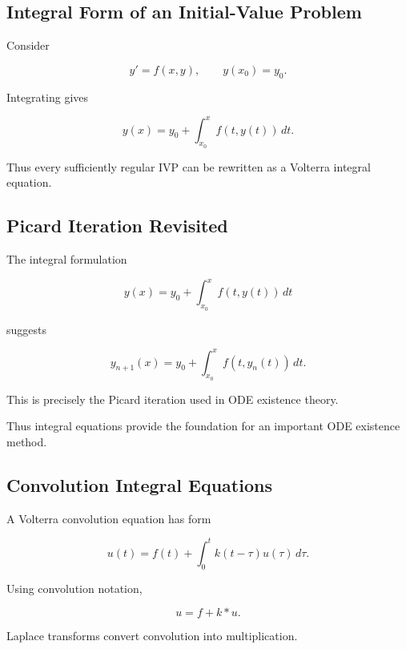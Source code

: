 \subsection{Integral Form of an Initial-Value Problem}
\label{subsec:ivp-integral-form}

Consider

\[
y'=f(x,y),
\qquad
y(x_0)=y_0.
\]

Integrating gives

\[
\boxed{
y(x)
=
y_0
+
\int_{x_0}^{x}
f(t,y(t))\,dt.
}
\]

Thus every sufficiently regular IVP can be rewritten as a Volterra
integral equation.

\subsection{Picard Iteration Revisited}
\label{subsec:picard-integral-equation}

The integral formulation

\[
y(x)
=
y_0
+
\int_{x_0}^{x}
f(t,y(t))\,dt
\]

suggests

\[
\boxed{
y_{n+1}(x)
=
y_0
+
\int_{x_0}^{x}
f(t,y_n(t))\,dt.
}
\]

This is precisely the Picard iteration used in ODE existence theory.

Thus integral equations provide the foundation for an important ODE
existence method.

\subsection{Convolution Integral Equations}
\label{subsec:convolution-integral-equations}

A Volterra convolution equation has form

\[
\boxed{
u(t)
=
f(t)
+
\int_0^t
k(t-\tau)u(\tau)\,d\tau.
}
\]

Using convolution notation,

\[
\boxed{
u
=
f+k*u.
}
\]

Laplace transforms convert convolution into multiplication.

